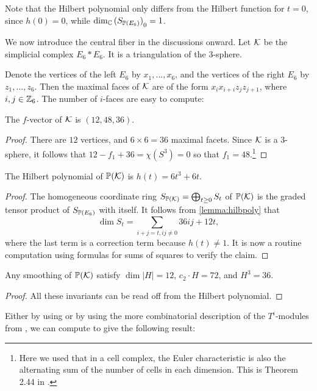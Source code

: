 Note that the Hilbert polynomial only differs from the Hilbert function for $t=0$, since $h(0)=0$, while $\dim_\C {(S_{\P(E_6)})}_0=1$. 

We now introduce the central fiber in the discussions onward. Let $\K$ be the simplicial complex $E_6 \ast E_6$. It is a triangulation of the $3$-sphere.

Denote the  vertices of the left $E_6$ by $x_1,\ldots,x_6$, and the vertices of the right $E_6$ by $z_1,\ldots,z_6$. Then the maximal faces of $\K$ are of the form $x_ix_{i+i}z_jz_{j+1}$, where $i,j \in \Z_6$. The number of $i$-faces are easy to compute:

\begin{lemma}
The $f$-vector of $\K$ is $(12,48,36)$. 
\end{lemma}
\begin{proof}
There are $12$ vertices, and $6 \times 6=36$ maximal facets. Since $\K$ is a 3-sphere, it follows that $12-f_1+36=\chi(S^3)=0$ so that $f_1=48$.\footnote{Here we used that in a cell complex, the Euler characteristic is also the alternating sum of the number of cells in each dimension. This is Theorem 2.44 in \cite{hatcher_topology}.}
\end{proof}

\begin{lemma}
The Hilbert polynomial of $\P(\K)$ is $h(t)=6t^3+6t$.
\end{lemma}
\begin{proof}
The homogeneous coordinate ring $S_{\P(\K)}= \bigoplus_{t \geq 0} S_t$ of $\P(\K)$ is the graded tensor product of $S_{\P(E_6)}$ with itself. It follows from \cref{lemma:hilbpoly} that
\[
\dim S_t = \sum_{i+j=t, ij \neq 0} 36ij + 12t,
\]
where the last term is a correction term because $h(t) \neq 1$. It is now a routine computation using formulas for sums of squares to verify the claim.
\end{proof}

\begin{corollary}
Any smoothing of $\P(\K)$ satisfy $\dim |H|=12$, $c_2 \cdot H = 72$, and $H^3=36$.
\end{corollary}
\begin{proof}
All these invariants can be read off from the Hilbert polynomial.
\end{proof}

Either by using \MM or by using the more combinatorial description of the $T^i$-modules from \cite{deforming_christophersen}, we can compute to give the following result:

